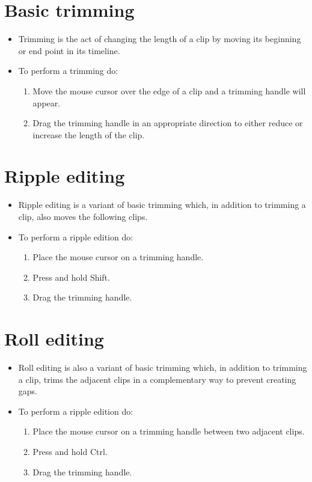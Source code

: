 \section{Basic trimming}

\begin{itemize}
\item Trimming is the act of changing the length of a clip by moving
  its beginning or end point in its timeline.
\item To perform a trimming do:
  \begin{enumerate}
  \item Move the mouse cursor over the edge of a clip and a trimming
    handle will appear.
  \item Drag the trimming handle in an appropriate direction to either
    reduce or increase the length of the clip.
  \end{enumerate}
\end{itemize}


\section{Ripple editing}

\begin{itemize}
\item Ripple editing is a variant of basic trimming which, in addition
  to trimming a clip, also moves the following clips.
  \item To perform a ripple edition do:
  \begin{enumerate}
  \item Place the mouse cursor on a trimming handle.
  \item Press and hold Shift.
  \item Drag the trimming handle.
  \end{enumerate}
\end{itemize}


\section{Roll editing}

\begin{itemize}
\item Roll editing is also a variant of basic trimming which, in addition
  to trimming a clip, trims the adjacent clips in a complementary way
  to prevent creating gaps.
\item To perform a ripple edition do:
  \begin{enumerate}
  \item Place the mouse cursor on a trimming handle between two adjacent clips.
  \item Press and hold Ctrl.
  \item Drag the trimming handle.
  \end{enumerate}
\end{itemize}

